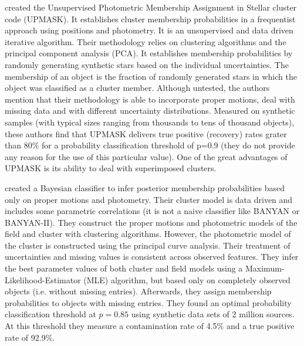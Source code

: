 \citet{KroneMartins2014} created the Unsupervised Photometric Membership Assignment in Stellar cluster code (UPMASK). It establishes cluster membership probabilities in a frequentist approach using positions and photometry. It is an unsupervised and data driven iterative algorithm. Their methodology relies on clustering algorithms and the principal component analysis (PCA). It establishes membership probabilities by randomly generating synthetic stars based on the individual uncertainties. The membership of an object is the fraction of randomly generated stars in which the object was classified as a cluster member. Although untested, the authors mention that their methodology is able to incorporate proper motions, deal with missing data and with different uncertainty distributions. Measured on synthetic samples (with typical sizes ranging from thousands to tens of thousand objects), these authors find that UPMASK delivers true positive (recovery) rates grater than 80\% for a probability classification threshold of p=0.9 (they do not provide any reason for the use of this particular value). One of the great advantages of  UPMASK is its ability to deal with superimposed clusters. 

\citet{Sarro2014} created a Bayesian classifier to infer posterior membership probabilities based only on proper motions and photometry. Their cluster model is data driven and includes some parametric correlations (it is not a naive classifier like BANYAN or BANYAN-II). They construct the proper motions and photometric models of the field and cluster with clustering algorithms. However, the photometric model of the cluster is constructed using the principal curve analysis. Their treatment of uncertainties and missing values is consistent across observed features. They infer the best parameter values of both cluster and field models using a Maximum-Likelihood-Estimator (MLE) algorithm, but based only on completely observed objects (i.e. without missing entries). Afterwards, they assign membership probabilities to objects with missing entries. They found an optimal probability classification threshold at $p=0.85$ using synthetic data sets of 2 million sources. At this threshold they measure a contamination rate of 4.5\% and a true positive rate of 92.9\%.

